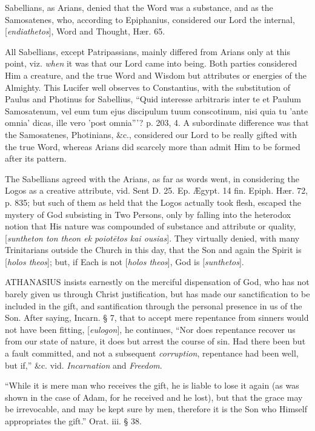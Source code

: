 Sabellians,
as Arians, denied that the Word was a substance, and as the
Samosatenes, who, according to Epiphanius, considered our Lord the
internal, [\emph{endiathetos}], Word and Thought, Hær. 65.

All
Sabellians, except Patripassians, mainly differed from Arians only at
this point, viz. \emph{when} it was that our Lord came into being.
Both parties considered Him a creature, and the true Word and Wisdom
but attributes or energies of the Almighty. This Lucifer well observes
to Constantius, with the substitution of Paulus and Photinus for
Sabellius, ``Quid interesse arbitraris inter te et Paulum Samosatenum,
vel eum tum ejus discipulum tuum conscotinum, nisi quia tu 'ante omnia'
dicas, ille vero 'post omnia'''? p. 203, 4. A subordinate difference
was that the Samosatenes, Photinians, \&c., considered our Lord to
be really gifted with the true Word, whereas Arians did scarcely more
than admit Him to be formed after its pattern.

The
Sabellians agreed with the Arians, as far as words went, in
considering the Logos as a creative attribute, vid. Sent D. 25. Ep. Ægypt.
14 fin. Epiph. Hær. 72, p. 835; but such of them as held that the
Logos actually took flesh, escaped the mystery of God subsisting in
Two Persons, only by falling into the heterodox notion that His
nature was compounded of substance and attribute or quality, [\emph{suntheton
ton theon ek poiot\={e}tos kai ousias}]. They virtually denied,
with many Trinitarians outside the Church in this day, that the Son
and again the Spirit is [\emph{holos theos}]; but, if Each is not [\emph{holos
theos}], God is [\emph{sunthetos}].


ATHANASIUS
insists earnestly on the merciful dispensation of God, who has not
barely given us through Christ justification, but has made our
sanctification to be included in the gift, and santification through
the personal presence in us of the Son. After saying, Incarn. § 7,
that to accept mere repentance from sinners would not have been
fitting, [\emph{eulogon}], he continues, ``Nor does repentance recover
us from our state of nature, it does but arrest the course of sin. Had
there been but a fault committed, and not a subsequent \emph{corruption},
repentance had been well, but if,'' \&c. vid. \emph{Incarnation} and
\emph{Freedom}.

``While
it is mere man who receives the gift, he is liable to lose it again
(as was shown in the case of Adam, for he received and he lost), but
that the grace may be irrevocable, and may be kept sure by men,
therefore it is the Son who Himself appropriates the gift.'' Orat. iii.
§ 38.


